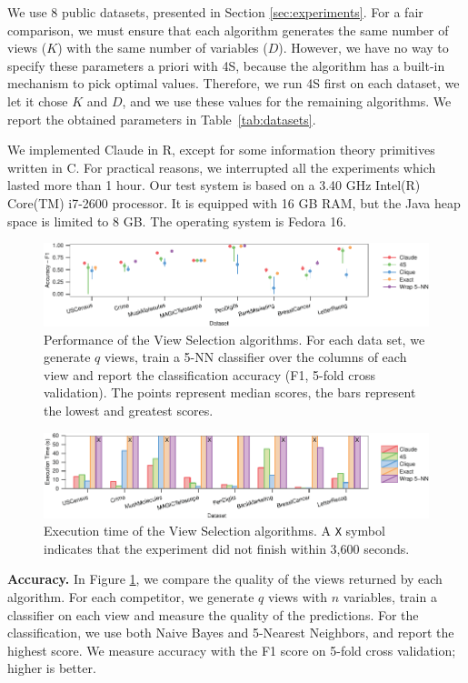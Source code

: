 We use 8 public datasets, presented in Section \ref{sec:experiments}. For a
fair comparison, we must ensure that each algorithm generates the same number
of views ($K$) with the same number of variables ($D$).  However, we have no
way to specify these parameters a priori with 4S, because the algorithm has a
built-in mechanism to pick optimal values. Therefore, we run 4S first on each
dataset, we let it chose $K$ and $D$, and we use these values for the remaining
algorithms.  We report the obtained parameters in Table~\ref{tab:datasets}.

We implemented Claude in R, except for some information theory primitives
written in C. For practical reasons, we interrupted all the experiments which
lasted more than 1 hour. Our test system is based on a 3.40 GHz Intel(R)
Core(TM) i7-2600 processor. It is equipped with 16 GB RAM, but the Java heap
space is limited to 8 GB. The operating system is Fedora 16. 

\begin{figure}[t!]
\centering
\includegraphics[width=1.8\columnwidth]{plots/view-scores}
\caption{Performance of the View Selection algorithms. For each data set, we
    generate $q$ views, train a 5-NN classifier over the columns of each view
    and report the classification accuracy (F1, 5-fold cross validation). The
    points represent median scores, the bars represent the lowest and greatest
    scores.} 
\label{pic:column-select-score}
\end{figure}
\begin{figure}[t!]
\centering
\includegraphics[width=1.8\columnwidth]{plots/view-times}
\caption{Execution time of the View Selection algorithms. A \texttt{X} symbol
indicates that the experiment did not finish within 3,600 seconds.}
\label{pic:column-select-time}
\end{figure}

\textbf{Accuracy.} In Figure \ref{pic:column-select-score}, we compare the
quality of the views returned by each algorithm. For each competitor, we
generate $q$ views with $n$ variables, train a classifier on each view and
measure the quality of the predictions. For the classification, we use both
Naive Bayes and 5-Nearest Neighbors, and report the highest score.  We measure
accuracy with the F1 score on 5-fold cross validation; higher is better.

